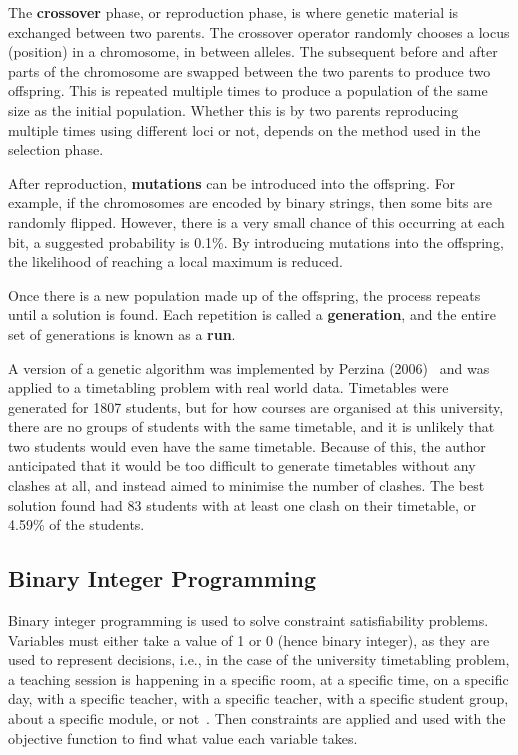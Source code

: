 \documentclass[a4paper, 12pt]{report}
\begin{document}
The \textbf{crossover} phase, or reproduction phase, is where genetic material
is exchanged between two parents.
The crossover operator randomly chooses a locus (position) in a chromosome,
in between alleles.
The subsequent before and after parts of the chromosome are swapped between the
two parents to produce two offspring.
This is repeated multiple times to produce a population of the same size as the
initial population.
Whether this is by two parents reproducing multiple times using different loci
or not, depends on the method used in the selection phase.

After reproduction, \textbf{mutations} can be introduced into the offspring. 
For example, if the chromosomes are encoded by binary strings, then some bits 
are randomly flipped.
However, there is a very small chance of this occurring at each bit, a suggested
probability is 0.1\%.
By introducing mutations into the offspring, the likelihood of reaching a local
maximum is reduced.

Once there is a new population made up of the offspring, the process repeats 
until a solution is found.
Each repetition is called a \textbf{generation}, and the entire set of
generations is known as a \textbf{run}.

A version of a genetic algorithm was implemented by Perzina 
(2006)~\cite{ga_example} and was applied to a timetabling problem with real 
world data.
Timetables were generated for 1807 students, but for how courses are organised 
at this university, there are no groups of students with the same timetable, and
it is unlikely that two students would even have the same timetable.
Because of this, the author anticipated that it would be too difficult to
generate timetables without any clashes at all, and instead aimed to minimise
the number of clashes.
The best solution found had 83 students with at least one clash on their
timetable, or 4.59\% of the students.

\subsection{Binary Integer Programming}

Binary integer programming is used to solve constraint satisfiability problems.
Variables must either take a value of 1 or 0 (hence binary integer), as they 
are used to represent decisions, i.e., in the case of the university 
timetabling problem, a teaching session is happening in a specific room, at a 
specific time, on a specific day, with a specific teacher, with a specific 
teacher, with a specific student group, about a specific module, or 
not~\cite{bip_example}.
Then constraints are applied and used with the objective function to find what
value each variable takes.
\end{document}
